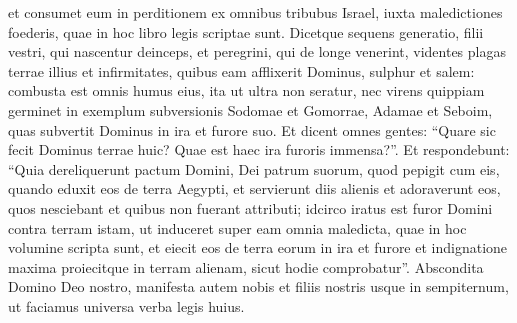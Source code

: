 \begin{biblechapter}
\verse et consumet eum in perditionem ex omnibus tribubus Israel, iuxta maledictiones foederis, quae in hoc libro legis scriptae sunt. 
\verse Dicetque sequens generatio, filii vestri, qui nascentur deinceps, et peregrini, qui de longe venerint, videntes plagas terrae illius et infirmitates, quibus eam afflixerit Dominus, 
\verse sulphur et salem: combusta est omnis humus eius, ita ut ultra non seratur, nec virens quippiam germinet in exemplum subversionis Sodomae et Gomorrae, Adamae et Seboim, quas subvertit Dominus in ira et furore suo. 
\verse Et dicent omnes gentes: “Quare sic fecit Dominus terrae huic? Quae est haec ira furoris immensa?”. 
\verse Et respondebunt: “Quia dereliquerunt pactum Domini, Dei patrum suorum, quod pepigit cum eis, quando eduxit eos de terra Aegypti, 
\verse et servierunt diis alienis et adoraverunt eos, quos nesciebant et quibus non fuerant attributi; 
\verse idcirco iratus est furor Domini contra terram istam, ut induceret super eam omnia maledicta, quae in hoc volumine scripta sunt, 
\verse et eiecit eos de terra eorum in ira et furore et indignatione maxima proiecitque in terram alienam, sicut hodie comprobatur”. 
\verse Abscondita Domino Deo nostro, manifesta autem nobis et filiis nostris usque in sempiternum, ut faciamus universa verba legis huius. 
\end{biblechapter}

